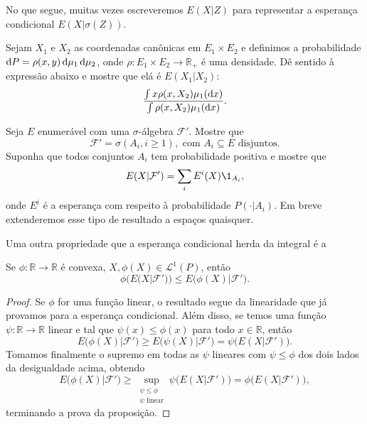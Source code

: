 No que segue, muitas vezes escreveremos $E(X|Z)$ para representar a esperança condicional $E(X|\sigma(Z))$.

\begin{exercise}
  Sejam $X_1$ e $X_2$ as coordenadas canônicas em $E_1 \times E_2$ e definimos a probabilidade $\mathop{}\!\mathrm{d} P = \rho(x,y) \mathop{}\!\mathrm{d} \mu_1 \mathop{}\!\mathrm{d} \mu_2$, onde $\rho:E_1 \times E_2 \to \mathbb{R}_+$ é uma densidade.
  Dê sentido à expressão abaixo e mostre que elá é $E(X_1|X_2)$:
  \begin{equation}
     \frac{\int x\rho(x, X_2) \mu_1(\mathop{}\!\mathrm{d} x)}{\int \rho(x, X_2) \mu_1(\mathop{}\!\mathrm{d} x)}.
  \end{equation}
\end{exercise}

\begin{exercise}
  Seja $E$ enumerável com uma $\sigma$-álgebra $\mathcal{F}'$.
  Mostre que
  \begin{equation}
    \mathcal{F}' = \sigma(A_i, i \geq 1), \text{ com $A_i \subseteq E$ disjuntos}.
  \end{equation}
  Suponha que todos conjuntos $A_i$ tem probabilidade positiva e mostre que
  \begin{equation}
    E(X|\mathcal{F}') = \sum_i E^i(X) \1_{A_i},
  \end{equation}
  onde $E^i$ é a esperança com respeito à probabilidade $P(\cdot|A_i)$.
  Em breve extenderemos esse tipo de resultado a espaços quaisquer.
\end{exercise}

Uma outra propriedade que a esperança condicional herda da integral é a

\begin{proposition}
  Se $\phi:\mathbb{R} \to \mathbb{R}$ é convexa, $X, \phi(X) \in \mathcal{L}^1(P)$, então
  \begin{equation}
    \phi\big( E(X|\mathcal{F}') \big) \leq E\big( \phi(X) | \mathcal{F}' \big).
  \end{equation}
\end{proposition}

\begin{proof}
  Se $\phi$ for uma função linear, o resultado segue da linearidade que já provamos para a esperança condicional.
  Além disso, se temos uma função $\psi:\mathbb{R} \to \mathbb{R}$ linear e tal que $\psi(x) \leq \phi(x)$ para todo $x \in \mathbb{R}$, então
  \begin{equation}
    E\big( \phi(X) | \mathcal{F}' \big) \geq E\big( \psi(X) | \mathcal{F}' \big) = \psi \big( E(X|\mathcal{F}') \big).
  \end{equation}
  Tomamos finalmente o supremo em todas as $\psi$ lineares com $\psi \leq \phi$ dos dois lados da desigualdade acima, obtendo
  \begin{equation}
    E\big( \phi(X) | \mathcal{F}' \big) \geq \sup_{\substack{\psi \leq \phi\\\psi \text{ linear}}} \psi \big( E(X|\mathcal{F}') \big) = \phi \big( E(X|\mathcal{F}') \big),
  \end{equation}
  terminando a prova da proposição.
\end{proof}

